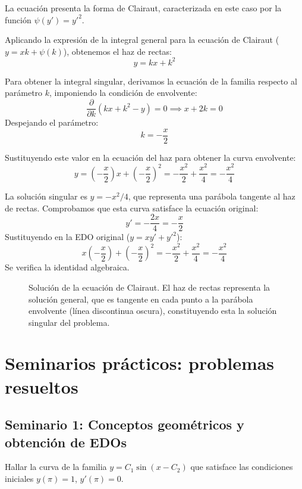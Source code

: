 \begin{tcolorbox}
La ecuación presenta la forma de Clairaut, caracterizada en este caso por la función $\psi(y') = y'^2$.

Aplicando la expresión de la integral general para la ecuación de Clairaut ($y = xk + \psi(k)$), obtenemos el haz de rectas:
$$ y = kx + k^2 $$

Para obtener la integral singular, derivamos la ecuación de la familia respecto al parámetro $k$, imponiendo la condición de envolvente:
$$ \frac{\partial}{\partial k} (kx + k^2 - y) = 0 \implies x + 2k = 0 $$
Despejando el parámetro:
$$ k = -\frac{x}{2} $$

Sustituyendo este valor en la ecuación del haz para obtener la curva envolvente:
$$ y = \left(-\frac{x}{2}\right)x + \left(-\frac{x}{2}\right)^2 = -\frac{x^2}{2} + \frac{x^2}{4} = -\frac{x^2}{4} $$

La solución singular es $y = -x^2/4$, que representa una parábola tangente al haz de rectas. Comprobamos que esta curva satisface la ecuación original:
$$ y' = -\frac{2x}{4} = -\frac{x}{2} $$
Sustituyendo en la EDO original ($y = x y' + y'^2$):
$$ x\left(-\frac{x}{2}\right) + \left(-\frac{x}{2}\right)^2 = -\frac{x^2}{2} + \frac{x^2}{4} = -\frac{x^2}{4} $$
Se verifica la identidad algebraica.

\begin{figure}[H]
    \centering
    
    \caption{Solución de la ecuación de Clairaut. El haz de rectas representa la solución general, que es tangente en cada punto a la parábola envolvente (línea discontinua oscura), constituyendo esta la solución singular del problema.}
\end{figure}
\end{tcolorbox}
\newpage

\section{Seminarios prácticos: problemas resueltos}

\subsection{Seminario 1: Conceptos geométricos y obtención de EDOs}

\begin{ejercicio}
Hallar la curva de la familia $y = C_1 \sin(x - C_2)$ que satisface las condiciones iniciales $y(\pi) = 1$, $y'(\pi) = 0$.
\end{ejercicio}

